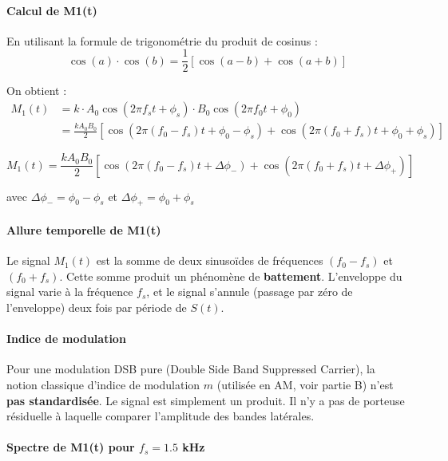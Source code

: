 \documentclass[11pt,a4paper]{article}
\begin{document}
\paragraph{Calcul de M1(t)}

En utilisant la formule de trigonométrie du produit de cosinus :
\begin{equation}
\cos(a) \cdot \cos(b) = \frac{1}{2}[\cos(a-b) + \cos(a+b)]
\end{equation}

On obtient :
\begin{align}
M_1(t) &= k \cdot A_0 \cos(2\pi f_s t + \phi_s) \cdot B_0 \cos(2\pi f_0 t + \phi_0) \\
&= \frac{k A_0 B_0}{2} [\cos(2\pi(f_0 - f_s)t + \phi_0 - \phi_s) + \cos(2\pi(f_0 + f_s)t + \phi_0 + \phi_s)]
\end{align}

\begin{equation}
\boxed{M_1(t) = \frac{k A_0 B_0}{2} [\cos(2\pi(f_0 - f_s)t + \Delta\phi_-) + \cos(2\pi(f_0 + f_s)t + \Delta\phi_+)]}
\end{equation}

avec $\Delta\phi_- = \phi_0 - \phi_s$ et $\Delta\phi_+ = \phi_0 + \phi_s$

\paragraph{Allure temporelle de M1(t)}

Le signal $M_1(t)$ est la somme de deux sinusoïdes de fréquences $(f_0 - f_s)$ et $(f_0 + f_s)$. Cette somme produit un phénomène de \textbf{battement}. L'enveloppe du signal varie à la fréquence $f_s$, et le signal s'annule (passage par zéro de l'enveloppe) deux fois par période de $S(t)$.

\paragraph{Indice de modulation}

Pour une modulation DSB pure (Double Side Band Suppressed Carrier), la notion classique d'indice de modulation $m$ (utilisée en AM, voir partie B) n'est \textbf{pas standardisée}. Le signal est simplement un produit. Il n'y a pas de porteuse résiduelle à laquelle comparer l'amplitude des bandes latérales.

\paragraph{Spectre de M1(t) pour $f_s = 1.5$ kHz}
\end{document}

